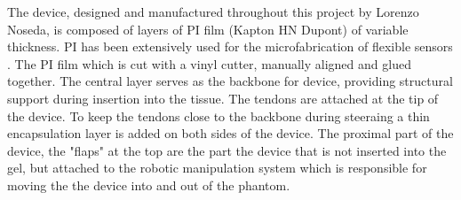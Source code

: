 The device, designed and manufactured throughout this project by Lorenzo Noseda, is composed of layers of PI film (Kapton HN Dupont) of variable thickness. PI has been extensively used for the microfabrication of flexible sensors \cite{noseda_flat_2024}. The PI film which is cut with a vinyl cutter, manually aligned and glued together. 
\newline \newline 
The central layer serves as the backbone for device, providing structural support during insertion into the tissue. The tendons are attached at the tip of the device. To keep the tendons close to the backbone during steeraing a thin encapsulation layer is added on both sides of the device. 
\newline \newline
The proximal part of the device, the "flaps" at the top are the part the device that is not inserted into the gel, but attached to the robotic manipulation system which is responsible for moving the the device into and out of the phantom.

